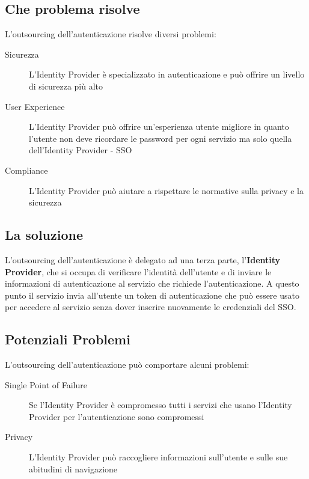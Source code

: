     \subsection{Che problema risolve}
        L'outsourcing dell'autenticazione risolve diversi problemi:
        \begin{description}
            \item[Sicurezza] L'Identity Provider è specializzato in autenticazione e può offrire un livello di sicurezza più alto
            \item[User Experience] L'Identity Provider può offrire un'esperienza utente migliore in quanto l'utente non deve ricordare le password per ogni servizio ma solo quella dell'Identity Provider - SSO
            \item[Compliance] L'Identity Provider può aiutare a rispettare le normative sulla privacy e la sicurezza
        \end{description}
    \subsection{La soluzione}
        L'outsourcing dell'autenticazione è delegato ad una terza parte, l'\textbf{Identity Provider}, che si occupa di verificare l'identità dell'utente e di inviare le informazioni di autenticazione al servizio che richiede l'autenticazione. A questo punto il servizio invia all'utente un token di autenticazione che può essere usato per accedere al servizio senza dover inserire nuovamente le credenziali del SSO.
    \subsection{Potenziali Problemi}
        L'outsourcing dell'autenticazione può comportare alcuni problemi:
        \begin{description}
            \item[Single Point of Failure] Se l'Identity Provider è compromesso tutti i servizi che usano l'Identity Provider per l'autenticazione sono compromessi
            \item[Privacy] L'Identity Provider può raccogliere informazioni sull'utente e sulle sue abitudini di navigazione
        \end{description}